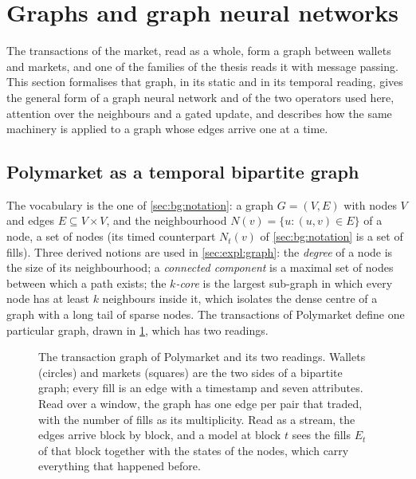 \section{Graphs and graph neural networks}
\label{sec:bg:graphs}
\label{sec:bg:graphs:concepts}

The transactions of the market, read as a whole, form a graph between wallets and markets,
and one of the families of the thesis reads it with message passing.  This section
formalises that graph, in its static and in its temporal reading, gives the general form of
a graph neural network and of the two operators used here, attention over the neighbours
and a gated update, and describes how the same machinery is applied to a graph whose edges
arrive one at a time.

\subsection{Polymarket as a temporal bipartite graph}
\label{sec:bg:graphs:polymarket}

The vocabulary is the one of \cref{sec:bg:notation}: a graph $G = (V, E)$ with nodes $V$
and edges $E \subseteq V \times V$, and the neighbourhood $N(v) = \{u : (u, v) \in E\}$ of
a node, a set of nodes (its timed counterpart $N_t(v)$ of \cref{sec:bg:notation} is a set
of fills).  Three derived notions are used in \cref{sec:expl:graph}: the \emph{degree} of a
node is the size of its neighbourhood; a \emph{connected component} is a maximal set of
nodes between which a path exists; the \emph{$k$-core} is the largest sub-graph in which
every node has at least $k$ neighbours inside it, which isolates the dense centre of a
graph with a long tail of sparse nodes.  The transactions of Polymarket define one
particular graph, drawn in \cref{fig:bg:graphobj}, which has two readings.

\begin{figure}[t]
\centering
\resizebox{\textwidth}{!}{}
\caption{The transaction graph of Polymarket and its two readings.  Wallets (circles) and
markets (squares) are the two sides of a bipartite graph; every fill is an edge with a
timestamp and seven attributes.  Read over a window, the graph has one edge per pair that
traded, with the number of fills as its multiplicity.  Read as a stream, the edges arrive
block by block, and a model at block $t$ sees the fills $E_t$ of that block together with
the states of the nodes, which carry everything that happened before.}
\label{fig:bg:graphobj}
\end{figure}

